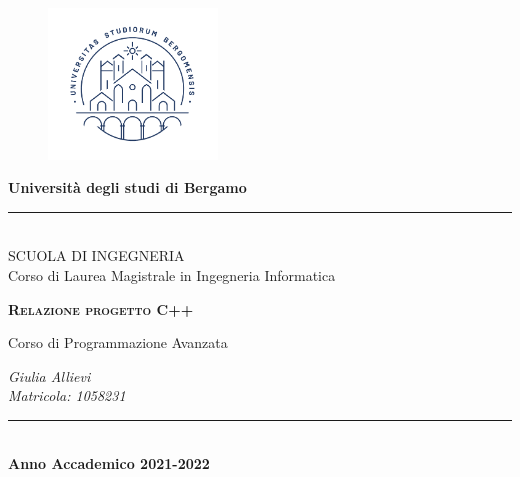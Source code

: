 \documentclass[a4paper,12pt]{article}
\newlength{\drop}
\begin{document}
  \begin{titlepage}
    \textheight
    \centering
    \begin{figure}[h]
\centering
\includegraphics[width=4.5cm]{immagini/imgproj}
\end{figure}
    \textbf{Università degli studi di Bergamo}
    \rule{\textwidth}{0.5pt}\\[0.2cm]
   SCUOLA DI INGEGNERIA\\[0.15cm]Corso di Laurea Magistrale in Ingegneria Informatica
   \\[\baselineskip]
    {\scshape
    \vspace*{5.5cm}
    \textbf{\LARGE {Relazione progetto C++\\[0.3cm]}}
    {\Large Corso di Programmazione Avanzata\\[2cm] \par}
    {\large{\itshape Giulia Allievi \\ Matricola: 1058231\par}}
    \vfill
    }
    \rule{\textwidth}{0.5pt}\\[0.5cm]
    
   \normalsize \textbf{Anno Accademico 2021-2022}
  \end{titlepage}


\newpage
\null
\thispagestyle{empty}
\newpage
\end{document}
